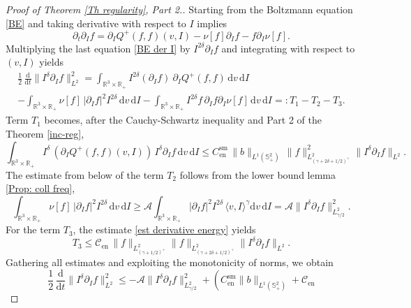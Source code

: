 \documentclass[11pt,a4paper]{amsart}
\newcommand{\bRp}{\mathbb{R}_+}
\newcommand{\bRfp}{\mathbb{R}^3 \times \bRp}
\newcommand{\bSp}{\mathbb{S}^2_+}
\newcommand{\md}{\mathrm{d}}
\newcommand{\g}{\gamma}
\newcommand{\la}{\langle}
\newcommand{\ra}{\rangle}
\newcommand{\Ls}{L^1}
\newcommand{\mA}{\mathcal{A}}
\newcommand{\test}{I^\delta}
\newcommand{\Csen}{C_{\text{en}}^{\text{sm}}}
\newcommand{\Clen}{\mathcal{C}_{\text{en}}}
\begin{document}
\begin{proof}[Proof of Theorem \ref{Th regularity}, Part 2.] Starting from the Boltzmann equation \eqref{BE} and 
taking derivative 
with respect to $I$ implies
\begin{equation}\label{BE der I}
	\partial_t \partial_{I} f =   \partial_{I} Q^+(f,f)(v,I) - 	\nu[f] \partial_{I} f  - f \partial_{I} 	\nu[f].
\end{equation}
Multiplying the last equation \eqref{BE der I}  by $I^{2\delta} \partial_{I} f $ and integrating with respect to $(v,I)$ yields
\begin{multline*}
\frac{1}{2}	\,\frac{\md}{\md t}  \| I^{\delta} \partial_{I} f \|_{{L}^{2}}^2 = 	\int_{ \bRfp } I^{2\delta} (\partial_{I} f) \  \partial_{I} Q^+(f,f)  \, \md v \, \md I
\\ - 	\int_{ \bRfp }	\nu[f] \, |\partial_{I} f|^2  I^{2\delta} \, \md v \, \md I
-  	\int_{ \bRfp } I^{2\delta} f \, \partial_{I}  f \partial_{I} 	\nu[f]  \, \md v \, \md I
=: T_1 - T_2 - T_3.
\end{multline*}
Term $T_1$ becomes, after the Cauchy-Schwartz inequality and Part 2 of the Theorem \ref{inc-reg}, 
	\begin{equation*}
	\int_{\bRfp} \test \, \left(\partial_{I}		Q^+(f,f)(v,I) \right) \, I^{\delta}   \partial_{I} f \, \md v \, \md I 
	\leq  \Csen \,   \| b \|_{\Ls(\bSp)}\, \| f\|^2_{L^2_{(\g+2\delta+1/2)^+}}      \| I^{\delta}   \partial_{I} f \|_{L^{2}}.
\end{equation*}
The estimate from below of  the term $T_2$ follows from the lower bound lemma \ref{Prop: coll freq},
\begin{equation*}
		\int_{ \bRfp }	\nu[f] \, |\partial_{I} f|^2  I^{2\delta} \, \md v \, \md I \geq \mA	\int_{ \bRfp }	  |\partial_{I} f|^2  I^{2\delta} \,  \la v, I \ra^{\g}  \md v \, \md I = \mA \| I^{\delta} \partial_{I} f \|_{{L}^{2}_{\g/2}}^2.
\end{equation*}
For the term $T_3$, the estimate \eqref{est derivative energy} yields
\begin{equation*}
	T_3  \leq \Clen \,	\| f \|_{L^{2}_{(\g+1/2)^+}} 	\| f \|_{L^{2}_{(\g+2\delta+1/2)^+}} \|  I^{\delta} \partial_{I} f \|_{L^2}.
\end{equation*}
Gathering all estimates and exploiting the monotonicity of norms,  we obtain
\begin{equation*}
	\frac{1}{2}	\,\frac{\md}{\md t}  \| I^{\delta} \partial_{I} f \|_{{L}^{2}}^2 \leq  - \mA \| I^{\delta} \partial_{I} f \|_{{L}^{2}_{\g/2}}^2 
	+	\left( \Csen \| b \|_{\Ls(\bSp)}    + \Clen	

\end{equation*}
\end{proof}
\end{document}
